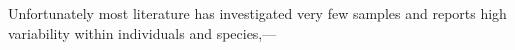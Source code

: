 Unfortunately most literature has investigated very few samples and reports high
variability within individuals and species,---
